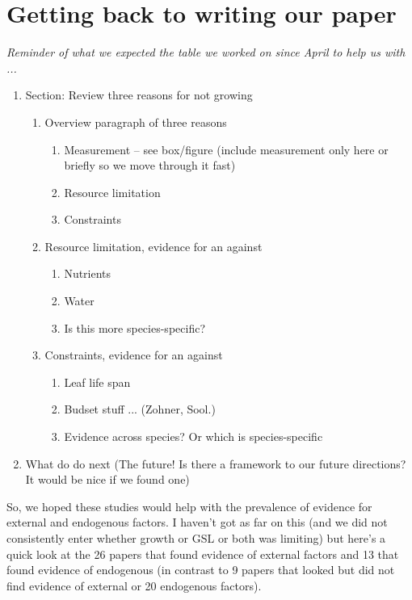 \documentclass[11pt]{article}
\begin{document}
\section{Getting back to writing our paper}

\emph{Reminder of what we expected the table we worked on since April to help us with ...}
\begin{enumerate}
\item Section: Review three reasons for not growing 
\begin{enumerate} 
\item Overview paragraph of three reasons
\begin{enumerate} 
\item Measurement -- see box/figure  (include measurement only here or briefly so we move through it fast)
\item Resource limitation
\item Constraints
\end{enumerate}
\item Resource limitation, evidence for an against 
\begin{enumerate}
\item Nutrients
\item Water
\item Is this more species-specific?
\end{enumerate}
\item Constraints, evidence for an against 
\begin{enumerate}
\item Leaf life span
\item Budset stuff ... (Zohner, Sool.)
\item Evidence across species? Or which is species-specific
\end{enumerate}
\end{enumerate}
\item What do do next (The future! Is there a framework to our future directions? It would be nice if we found one) 
\end{enumerate}

\vspace{5ex}
So, we hoped these studies would help with the prevalence of evidence for external and endogenous factors. I haven't got as far on this (and we did not consistently enter whether growth or GSL or both was limiting) but here's a quick look at the 26 papers that found evidence of external factors and 13 that found evidence of endogenous (in contrast to 9 papers that looked but did not find evidence of external or 20 endogenous factors).
\end{document}
